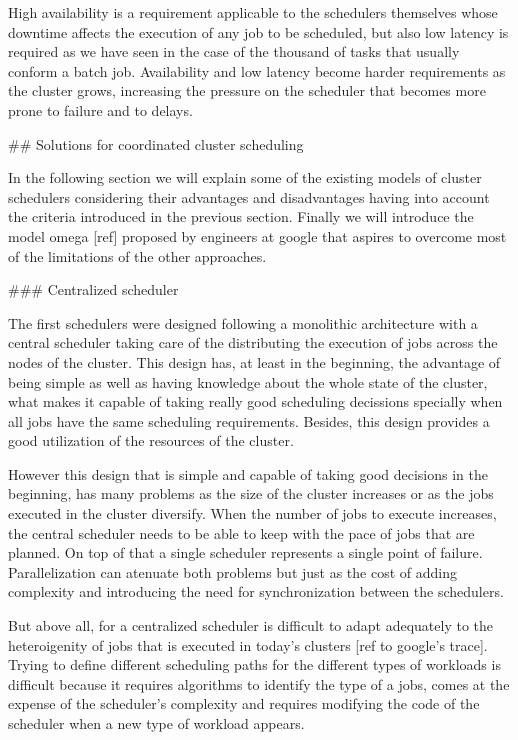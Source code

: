 High availability is a requirement applicable to the schedulers
themselves whose downtime affects the execution of any job to be
scheduled, but also low latency is required as we have seen in the
case of the thousand of tasks that usually conform a batch
job. Availability and low latency become harder requirements as the
cluster grows, increasing the pressure on the scheduler that becomes
more prone to failure and to delays.

## Solutions for coordinated cluster scheduling

In the following section we will explain some of the existing models
of cluster schedulers considering their advantages and disadvantages
having into account the criteria introduced in the previous
section. Finally we will introduce the model omega [ref] proposed by
engineers at google that aspires to overcome most of the
limitations of the other approaches.

### Centralized scheduler

The first schedulers were designed following a monolithic architecture
with a central scheduler taking care of the distributing the execution
of jobs across the nodes of the cluster. This design has, at least in
the beginning, the advantage of being simple as well as having
knowledge about the whole state of the cluster, what makes it capable
of taking really good scheduling decissions specially when all jobs
have the same scheduling requirements. Besides, this design provides a
good utilization of the resources of the cluster.

However this design that is simple and capable of taking good
decisions in the beginning, has many problems as the size of the
cluster increases or as the jobs executed in the cluster
diversify. When the number of jobs to execute increases, the central
scheduler needs to be able to keep with the pace of jobs that are
planned. On top of that a single scheduler represents a single point
of failure. Parallelization can atenuate both problems but just as the
cost of adding complexity and introducing the need for synchronization
between the schedulers.

But above all, for a centralized scheduler is difficult to adapt
adequately to the heteroigenity of jobs that is executed in today's
clusters [ref to google's trace]. Trying to define different
scheduling paths for the different types of workloads is difficult
because it requires algorithms to identify the type of a jobs, comes
at the expense of the scheduler's complexity and requires modifying
the code of the scheduler when a new type of workload appears.

